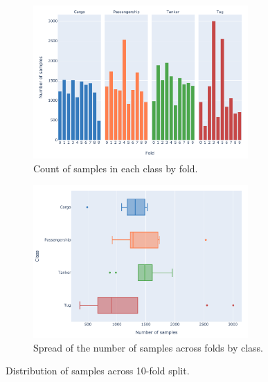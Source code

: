 \begin{figure}
    \ContinuedFloat
    \begin{subfigure}{\textwidth}
        \centering
        \includegraphics[width=0.9\textwidth]{img/ch3/deepship_figs/10_class_counts_facet.pdf}
        \caption{Count of samples in each class by fold.}
        \label{fig:10-fold-counts-facet}
    \end{subfigure}

    \vspace{1.5cm}
    
    \begin{subfigure}{\textwidth}
        \centering
        \includegraphics[width=0.9\textwidth]{img/ch3/deepship_figs/10_fold_spread.pdf}
        \caption{Spread of the number of samples across folds by class.}
        \label{fig:10-fold-spread}
    \end{subfigure}
    \caption{Distribution of samples across 10-fold split.}
    \label{fig:10-fold-overview}
\end{figure}

